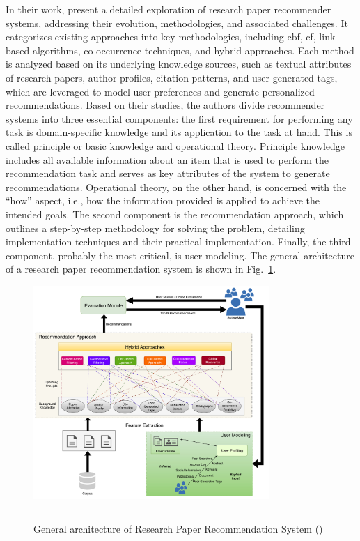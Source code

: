 In their work, \textcite{Sharma2023} present a detailed exploration of research paper recommender systems, addressing their evolution, methodologies, and associated challenges.
It categorizes existing approaches into key methodologies, including \gls{cbf}, \gls{cf}, link-based algorithms, co-occurrence techniques, and hybrid approaches.
Each method is analyzed based on its underlying knowledge sources, such as textual attributes of research papers, author profiles, citation patterns, and user-generated tags, which are leveraged to model user preferences and generate personalized recommendations.
Based on their studies, the authors divide recommender systems into three essential components: the first requirement for performing any task is domain-specific knowledge and its application to the task at hand.
This is called principle or basic knowledge and operational theory.
Principle knowledge includes all available information about an item that is used to perform the recommendation task and serves as key attributes of the system to generate recommendations.
Operational theory, on the other hand, is concerned with the ``how'' aspect, i.e., how the information provided is applied to achieve the intended goals.
The second component is the recommendation approach, which outlines a step-by-step methodology for solving the problem, detailing implementation techniques and their practical implementation.
Finally, the third component, probably the most critical, is user modeling.
The general architecture of a research paper recommendation system is shown in Fig.~\ref{fig:general-architecture-rprs}.

\begin{figure}[htbp]
    \centering
 \includegraphics[width=0.8\textwidth]{03_Figures/literature-review/general-architecture-rprs.png}
     \rule{35em}{0.5pt}
    \caption{General architecture of Research Paper Recommendation System (\textcite{Sharma2023})}
 \label{fig:general-architecture-rprs}
\end{figure}

